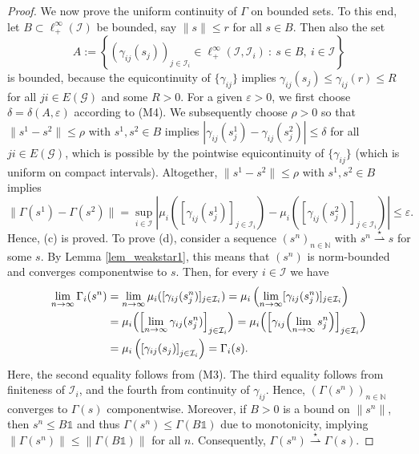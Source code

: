 \documentclass[10pt, oneside, a4paper]{article}
\newcommand{\N}{\mathbb{N}}
\newcommand{\ep}{\varepsilon}
\newcommand{\unit}{\mathds{1}}
\newcommand{\GC}{\mathcal{G}}
\newcommand{\IC}{\mathcal{I}}
\begin{document}
\begin{proof}
We now prove the uniform continuity of $\Gamma$ on bounded sets. To this end, let $B \subset \ell^{\infty}_+(\IC)$ be bounded, say $\|s\| \leq r$ for all $s \in B$. Then also the set%
\begin{equation*}
  A := \left\{ (\gamma_{ij}(s_j))_{j \in \IC_i} \in \ell^{\infty}_+(\IC,\IC_i)\ :\ s \in B,\ i \in \IC \right\}%
\end{equation*}
is bounded, because the equicontinuity of $\{\gamma_{ij}\}$ implies $\gamma_{ij}(s_j) \leq \gamma_{ij}(r) \leq R$ for all $ji \in E(\GC)$ and some $R > 0$. For a given $\ep > 0$, we first choose $\delta = \delta(A,\ep)$ according to (M4). We subsequently choose $\rho > 0$ so that $\|s^1 - s^2\| \leq \rho$ with $s^1,s^2 \in B$ implies $|\gamma_{ij}(s^1_j) - \gamma_{ij}(s^2_j)| \leq \delta$ for all $ji \in E(\GC)$, which is possible by the pointwise equicontinuity of $\{\gamma_{ij}\}$ (which is uniform on compact intervals). Altogether, $\|s^1 - s^2\| \leq \rho$ with $s^1,s^2 \in B$ implies%
\begin{equation*}
  \|\Gamma(s^1) - \Gamma(s^2)\| = \sup_{i \in \IC} \left|\mu_i( [\gamma_{ij}(s^1_j)]_{j \in \IC_i} ) - \mu_i( [\gamma_{ij}(s^2_j)]_{j \in \IC_i} )\right| \leq \ep.%
\end{equation*}
Hence, (c) is proved. To prove (d), consider a sequence $(s^n)_{n\in\N}$ with $s^n \stackrel{\star}{\rightharpoonup} s$ for some $s$. By Lemma \ref{lem_weakstar1}, this means that $(s^n)$ is norm-bounded and converges componentwise to $s$. Then, for every $i \in \IC$ we have%
\begin{align*}
  \lim_{n \rightarrow \infty} \Gamma_i(s^n) &= \lim_{n \rightarrow \infty} \mu_i( [\gamma_{ij}(s^n_j)]_{j\in\IC_i} ) = \mu_i\left( \lim_{n \rightarrow \infty} [\gamma_{ij}(s^n_j)]_{j\in\IC_i} \right) \\
																						&= \mu_i\Bigl( \Bigl[\lim_{n\rightarrow\infty}\gamma_{ij}(s^n_j)\Bigr]_{j\in\IC_i} \Bigr) = \mu_i\Bigl( \Bigl[\gamma_{ij}\Bigl(\lim_{n\rightarrow\infty}s^n_j\Bigr)\Bigr]_{j\in\IC_i} \Bigr) \\
																						&= \mu_i\left( \left[\gamma_{ij}(s_j)\right]_{j\in\IC_i} \right) = \Gamma_i(s).%
\end{align*}
Here, the second equality follows from (M3). The third equality follows from finiteness of $\IC_i$, and the fourth from continuity of $\gamma_{ij}$. Hence, $(\Gamma(s^n))_{n\in\N}$ converges to $\Gamma(s)$ componentwise. Moreover, if $B > 0$ is a bound on $\|s^n\|$, then $s^n \leq B\unit$ and thus $\Gamma(s^n) \leq \Gamma(B\unit)$ due to monotonicity, implying $\|\Gamma(s^n)\| \leq \|\Gamma(B\unit)\|$ for all $n$. Consequently, $\Gamma(s^n) \stackrel{\star}{\rightharpoonup} \Gamma(s)$.
\end{proof}
\end{document}
